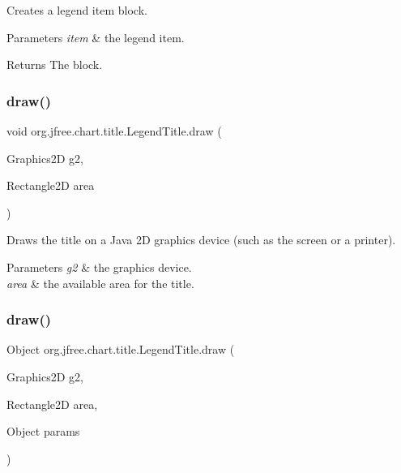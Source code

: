 Creates a legend item block.


\begin{DoxyParams}{Parameters}
{\em item} & the legend item.\\
\hline
\end{DoxyParams}
\begin{DoxyReturn}{Returns}
The block. 
\end{DoxyReturn}
\mbox{\label{classorg_1_1jfree_1_1chart_1_1title_1_1_legend_title_a4df683b4d81fb14c8b769f394612c154}} 
\subsubsection{\texorpdfstring{draw()}{draw()}\hspace{0.1cm}{\footnotesize\ttfamily [1/2]}}
{\footnotesize\ttfamily void org.\+jfree.\+chart.\+title.\+Legend\+Title.\+draw (\begin{DoxyParamCaption}\item[{Graphics2D}]{g2,  }\item[{Rectangle2D}]{area }\end{DoxyParamCaption})}

Draws the title on a Java 2D graphics device (such as the screen or a printer).


\begin{DoxyParams}{Parameters}
{\em g2} & the graphics device. \\
\hline
{\em area} & the available area for the title. \\
\hline
\end{DoxyParams}
\mbox{\label{classorg_1_1jfree_1_1chart_1_1title_1_1_legend_title_a006fb515a2acc72597f9355efc99d1c9}} 
\subsubsection{\texorpdfstring{draw()}{draw()}\hspace{0.1cm}{\footnotesize\ttfamily [2/2]}}
{\footnotesize\ttfamily Object org.\+jfree.\+chart.\+title.\+Legend\+Title.\+draw (\begin{DoxyParamCaption}\item[{Graphics2D}]{g2,  }\item[{Rectangle2D}]{area,  }\item[{Object}]{params }\end{DoxyParamCaption})}

